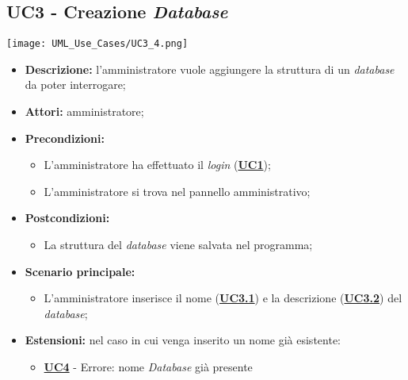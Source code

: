 \subsection{UC3 - Creazione \textit{Database}}
\label{sec:UC3}
\texttt{[image: UML\_Use\_Cases/UC3\_4.png]}
\begin{itemize}
	\item \textbf{Descrizione:} l’amministratore vuole aggiungere la struttura di un \textit{database} da poter interrogare;
	\item \textbf{Attori:} amministratore;
	\item \textbf{Precondizioni:} 
	\begin{itemize}
		\item L’amministratore ha effettuato il \textit{login} (\hyperref[sec:UC1]{\textbf{UC1}});
		\item L’amministratore si trova nel pannello amministrativo;
	\end{itemize}
	\item \textbf{Postcondizioni:} 
	\begin{itemize}
		\item La struttura del \textit{database} viene salvata nel programma;
	\end{itemize}
	\item \textbf{Scenario principale:} 
	\begin{itemize}
		\item L’amministratore inserisce il nome (\hyperref[sec:UC3.1]{\textbf{UC3.1}}) e la descrizione (\hyperref[sec:UC3.2]{\textbf{UC3.2}}) del \textit{database};
	\end{itemize}
	\item \textbf{Estensioni:} nel caso in cui venga inserito un nome già esistente:
	\begin{itemize}
		\item \hyperref[sec:UC4]{\textbf{UC4}} - Errore: nome \textit{Database} già presente
	\end{itemize}
\end{itemize}

